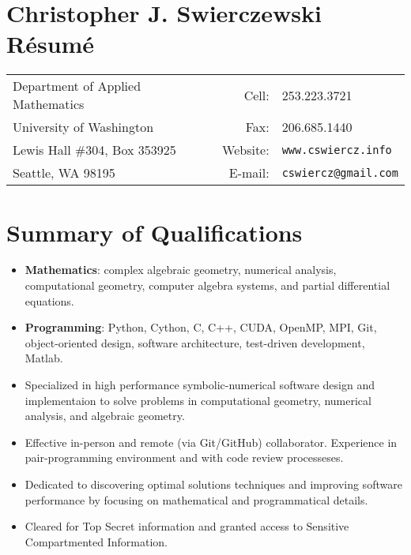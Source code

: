 \documentclass{article}
\begin{document}
\section*{Christopher J. Swierczewski \hspace{5.9cm} R\'esum\'e}

\begin{tabular}{lrl}
  Department of Applied Mathematics \hspace{5cm} & Cell:    & 253.223.3721 \\
  University of Washington          & Fax:         & 206.685.1440            \\
  Lewis Hall \#304, Box 353925      & Website:     & \tt www.cswiercz.info   \\
  Seattle, WA 98195                 & E-mail:      & \tt cswiercz@gmail.com
\end{tabular}

\section*{Summary of Qualifications}

\begin{itemize}
  \setlength{\itemsep}{0pt}
  \item {\bf Mathematics}: complex algebraic geometry, numerical analysis,
    computational geometry, computer algebra systems, and partial differential
    equations.
  \item {\bf Programming}: Python, Cython, C, C++, CUDA, OpenMP, MPI, Git,
    object-oriented design, software architecture, test-driven development,
    Matlab.
  \item Specialized in high performance symbolic-numerical software design and
    implementaion to solve problems in computational geometry, numerical
    analysis, and algebraic geometry.
  \item Effective in-person and remote (via Git/GitHub) collaborator. Experience
    in pair-programming environment and with code review processeses.
  \item Dedicated to discovering optimal solutions techniques and improving
    software performance by focusing on mathematical and programmatical details.
  \item Cleared for Top Secret information and granted access to Sensitive
    Compartmented Information.
\end{itemize}
\end{document}
